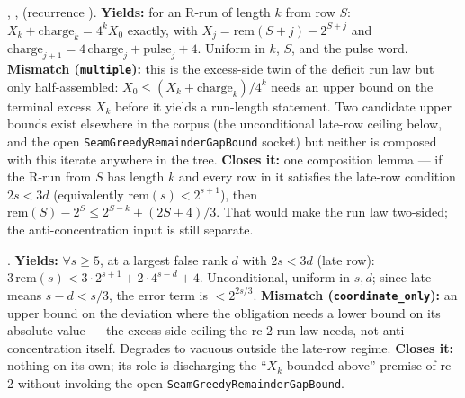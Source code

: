 \begin{obs} 
,
,
(recurrence ).
\textbf{Yields:} for an R-run of length $k$ from row $S$: $X_k + \mathrm{charge}_k = 4^k X_0$
exactly, with $X_j = \mathrm{rem}(S+j) - 2^{S+j}$ and $\mathrm{charge}_{j+1} = 4\,\mathrm{charge}_j
+ \mathrm{pulse}_j + 4$. Uniform in $k$, $S$, and the pulse word.
\textbf{Mismatch (\texttt{multiple}):} this is the excess-side twin of the deficit run law but
only half-assembled: $X_0 \le (X_k+\mathrm{charge}_k)/4^k$ needs an upper bound on the terminal
excess $X_k$ before it yields a run-length statement. Two candidate upper bounds exist
elsewhere in the corpus (the unconditional late-row ceiling below, and the open
\texttt{SeamGreedyRemainderGapBound} socket) but neither is composed with this iterate anywhere
in the tree.
\textbf{Closes it:} one composition lemma — if the R-run from $S$ has length $k$ and every row in
it satisfies the late-row condition $2s<3d$ (equivalently $\mathrm{rem}(s) < 2^{s+1}$), then
$\mathrm{rem}(S) - 2^S \le 2^{S-k} + (2S+4)/3$. That would make the run law two-sided; the
anti-concentration input is still separate.
\end{obs}

\begin{obs} 
.
\textbf{Yields:} $\forall s \ge 5$, at a largest false rank $d$ with $2s<3d$ (late row):
$3\,\mathrm{rem}(s) < 3\cdot 2^{s+1} + 2\cdot4^{s-d}+4$. Unconditional, uniform in $s,d$; since
late means $s-d<s/3$, the error term is $<2^{2s/3}$.
\textbf{Mismatch (\texttt{coordinate\_only}):} an upper bound on the deviation where the
obligation needs a lower bound on its absolute value — the excess-side ceiling the rc-2 run
law needs, not anti-concentration itself. Degrades to vacuous outside the late-row regime.
\textbf{Closes it:} nothing on its own; its role is discharging the ``$X_k$ bounded above''
premise of rc-2 without invoking the open \texttt{SeamGreedyRemainderGapBound}.
\end{obs}

